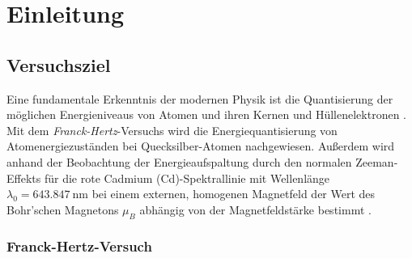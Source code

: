 \chapter{Einleitung}

\section{Versuchsziel}

Eine fundamentale Erkenntnis der modernen Physik ist die Quantisierung der möglichen Energieniveaus von Atomen und ihren Kernen und Hüllenelektronen \cite[112]{Demtroeder3}. Mit dem \textit{Franck-Hertz}-Versuchs wird die Energiequantisierung von Atomenergiezuständen bei Quecksilber-Atomen nachgewiesen. Außerdem wird anhand der Beobachtung der
Energieaufspaltung durch den normalen Zeeman-Effekts für die rote Cadmium (Cd)-Spektrallinie mit Wellenlänge $\lambda_0=\SI{643.847}{\nano\meter}$ \cite{NISTcd} bei einem externen, homogenen Magnetfeld der Wert des Bohr'schen Magnetons $\mu_B$ abhängig von der Magnetfeldstärke bestimmt \cite[3]{Versuchsanleitung401}.

\subsection{Franck-Hertz-Versuch} \label{sec:fh_intro}

